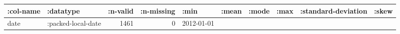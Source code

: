 \documentclass[]{article}
\begin{document}
\begin{longtable}[]{@{}llrrllllrr@{}}
\toprule
\begin{minipage}[b]{0.08\columnwidth}\raggedright\strut
:col-name\strut
\end{minipage} & \begin{minipage}[b]{0.11\columnwidth}\raggedright\strut
:datatype\strut
\end{minipage} & \begin{minipage}[b]{0.06\columnwidth}\raggedleft\strut
:n-valid\strut
\end{minipage} & \begin{minipage}[b]{0.07\columnwidth}\raggedleft\strut
:n-missing\strut
\end{minipage} & \begin{minipage}[b]{0.07\columnwidth}\raggedright\strut
:min\strut
\end{minipage} & \begin{minipage}[b]{0.07\columnwidth}\raggedright\strut
:mean\strut
\end{minipage} & \begin{minipage}[b]{0.04\columnwidth}\raggedright\strut
:mode\strut
\end{minipage} & \begin{minipage}[b]{0.07\columnwidth}\raggedright\strut
:max\strut
\end{minipage} & \begin{minipage}[b]{0.11\columnwidth}\raggedleft\strut
:standard-deviation\strut
\end{minipage} & \begin{minipage}[b]{0.07\columnwidth}\raggedleft\strut
:skew\strut
\end{minipage}\tabularnewline
\midrule
\endhead
\begin{minipage}[t]{0.08\columnwidth}\raggedright\strut
date\strut
\end{minipage} & \begin{minipage}[t]{0.11\columnwidth}\raggedright\strut
:packed-local-date\strut
\end{minipage} & \begin{minipage}[t]{0.06\columnwidth}\raggedleft\strut
1461\strut
\end{minipage} & \begin{minipage}[t]{0.07\columnwidth}\raggedleft\strut
0\strut
\end{minipage} & \begin{minipage}[t]{0.07\columnwidth}\raggedright\strut
2012-01-01\strut
\end{minipage} & \begin{minipage}[t]{0.07\columnwidth}\raggedright\strut

\end{minipage}
\end{longtable}
\end{document}
